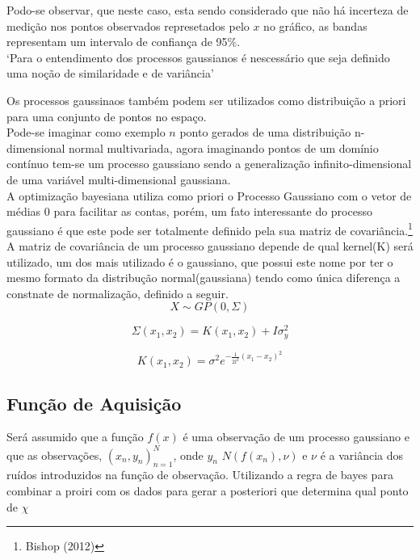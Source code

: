 \documentclass[
	12pt,				%
	openright,			%
	twoside,			%
	a4paper,			%
	english,			%
	french,				%
	spanish,			%
	brazil,				%
]{abntex2}
\begin{document}
Podo-se observar, que neste caso, esta sendo considerado que não há
incerteza de medição nos pontos observados represetados pelo \(x\) no
gráfico, as bandas representam um intervalo de confiança de 95\%.\\

`Para o entendimento dos processos gaussianos é nescessário que seja
definido uma noção de similaridade e de variância'

Os processos gaussinaos também podem ser utilizados como distribuição a
priori para uma conjunto de pontos no espaço.\\

Pode-se imaginar como exemplo \(n\) ponto gerados de uma distribuição
n-dimensional normal multivariada, agora imaginando pontos de um domínio
contínuo tem-se um processo gaussiano sendo a generalização
infinito-dimensional de uma variável multi-dimensional gaussiana.\\

A optimização bayesiana utiliza como priori o Processo Gaussiano com o
vetor de médias 0 para facilitar as contas, porém, um fato interessante
do processo gaussiano é que este pode ser totalmente definido pela sua
matriz de covariância.\footnote{Bishop (2012)}\\

A matriz de covariância de um processo gaussiano depende de qual
kernel(K) será utilizado, um dos mais utilizado é o gaussiano, que
possui este nome por ter o mesmo formato da distribução
normal(gaussiana) tendo como única diferença a constnate de
normalização, definido a seguir.\\

\[
X \sim GP(0,\Sigma)
\]

\[
\Sigma(x_1,x_2) = K(x_1,x_2) + I\sigma^2_y
\]

\[
K(x_1,x_2) = \sigma^2 e^{-\frac{1}{2l^2}(x_1-x_2)^2}
\]

\hypertarget{funuxe7uxe3o-de-aquisiuxe7uxe3o}{%
\subsection{Função de Aquisição}\label{funuxe7uxe3o-de-aquisiuxe7uxe3o}}

Será assumido que a função \(f(x)\) é uma observação de um processo
gaussiano e que as observações, \((x_n,y_n)_{n=1}^N\), onde
\(y_n \mbox{~} N(f(x_n),\nu)\) e \(\nu\) é a variância dos ruídos
introduzidos na função de observação. Utilizando a regra de bayes para
combinar a proiri com os dados para gerar a posteriori que determina
qual ponto de \(\chi\)
\end{document}
